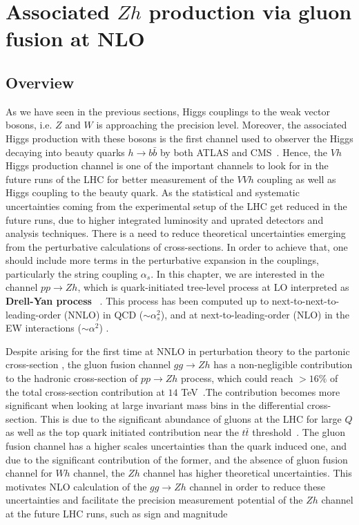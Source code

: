 \chapter{ Associated $Zh$ production via gluon fusion at NLO }\label{chap:hz}
\section{Overview}
\par As we have seen in the previous sections, Higgs couplings to the weak vector bosons, i.e. $Z$ and $W$ is approaching the precision level. Moreover, the associated Higgs production with these bosons is the first channel used to observer the Higgs decaying into beauty quarks   $h \rightarrow b \bar{b}$ by both ATLAS and CMS~\cite{Aaboud:2018zhk, Sirunyan:2018kst}. Hence, the $ Vh$ Higgs production channel is one of the important channels to look for in the future runs of the LHC for better measurement of the $VVh$ coupling as well as Higgs coupling to the beauty quark. As the statistical and systematic uncertainties coming from the experimental setup of the LHC get reduced in the future runs, due to higher integrated luminosity and uprated detectors and analysis techniques. There is a  need to reduce theoretical uncertainties emerging from the perturbative calculations of  cross-sections. In order to achieve that, one should include more terms in the perturbative expansion in the couplings, particularly the string coupling $\alpha_s$. In this chapter, we are interested in the channel $pp\to Zh$, which is quark-initiated tree-level process at LO interpreted as \textbf{Drell-Yan process}~ \cite{Han:1991ia,Brein:2003wg}. This process has been computed up to next-to-next-to-leading-order (NNLO) in QCD ($\sim \alpha_s^2$), and
at next-to-leading-order (NLO) in the EW interactions ($\sim \alpha^2 $) \cite{Amoroso:2020lgh}.
\par Despite arising for the first time at NNLO in perturbation theory to the partonic cross-section  , the gluon fusion channel $g g \rightarrow Zh$ has a non-negligible contribution to the hadronic cross-section of  $pp\to Zh$ process, which could reach $>16\%$ of the total cross-section contribution at $14$ TeV~\cite{Cepeda:2019klc}.The contribution becomes more significant when looking at large invariant mass bins in the differential cross-section. This is due to the significant abundance of gluons at the LHC for large $Q$ as well as the top quark initiated contribution near the $t\bar t$ threshold~\cite{Englert:2013vua}.  The gluon fusion channel has a higher scales uncertainties than the quark induced one, and due to the significant contribution of the former, and the absence of gluon fusion channel for $Wh$ channel, the $Zh$ channel has  higher theoretical uncertainties. This motivates NLO calculation of the  $g g \rightarrow Z h$ channel in order to reduce these uncertainties and facilitate the precision measurement potential of the $Zh$ channel at the future LHC runs, such as sign and magnitude
